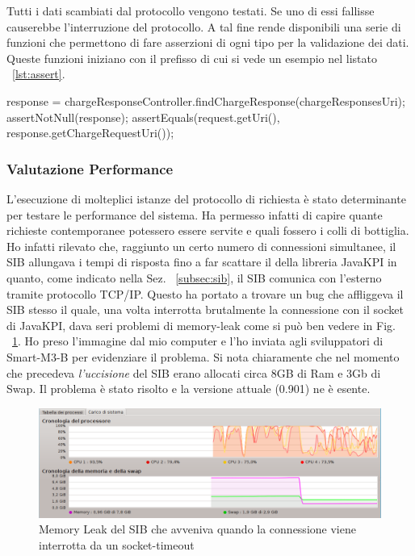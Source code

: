 Tutti i dati scambiati dal protocollo vengono testati. Se uno di essi fallisse causerebbe l'interruzione del protocollo. A tal fine  rende disponibili una serie di funzioni che permettono di fare asserzioni di ogni tipo per la validazione dei dati. Queste funzioni iniziano con il prefisso  di cui si vede un esempio nel listato ~\ref{lst:assert}.

\begin{java}[caption={Risposta ricavata a partire dall'uri, test del risultato},label={lst:assert}]
response = chargeResponseController.findChargeResponse(chargeResponsesUri);
assertNotNull(response);
assertEquals(request.getUri(), response.getChargeRequestUri());
\end{java}

\subsubsection{Valutazione Performance}

L'esecuzione di molteplici istanze del protocollo di richiesta è stato determinante per testare le performance del sistema. Ha permesso infatti di capire quante richieste contemporanee potessero essere servite e quali fossero i colli di bottiglia. Ho infatti rilevato che, raggiunto un certo numero di connessioni simultanee, il SIB allungava i tempi di risposta fino a far scattare il  della libreria JavaKPI in quanto, come indicato nella Sez. ~\ref{subsec:sib}, il SIB comunica con l'esterno tramite protocollo TCP/IP. Questo ha portato a trovare un bug che affliggeva il SIB stesso il quale, una volta interrotta brutalmente la connessione con il socket di JavaKPI, dava seri problemi di memory-leak come si può ben vedere in Fig. ~\ref{fig:sib-memory-leak}. Ho preso l'immagine dal mio computer e l'ho inviata agli sviluppatori di Smart-M3-B per evidenziare il problema. Si nota chiaramente che nel momento che precedeva \emph{l'uccisione} del SIB erano allocati circa 8GB di Ram e 3Gb di Swap. Il problema è stato risolto e la versione attuale (0.901) ne è esente.

\begin{figure}[H]
	\centering
	\includegraphics[width=1.0\textwidth]{assets/sib-memory-leak.png}
	\caption{Memory Leak del SIB che avveniva quando la connessione viene interrotta da un socket-timeout}
	\label{fig:sib-memory-leak}
\end{figure}

